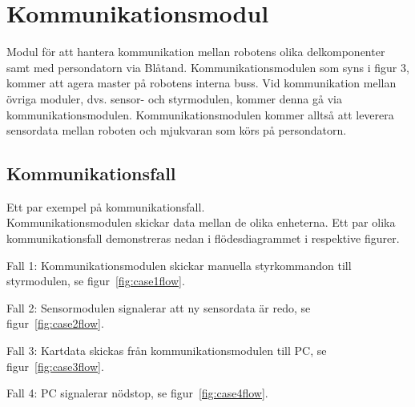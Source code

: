 \documentclass[a4paper,12pt,fleqn]{article}
\begin{document}
\addto\captionsswedish{\renewcommand{\contentsname}{Innehållsförteckning}}

\tableofcontents
\thispagestyle{fancy}
\newpage







\section{Kommunikationsmodul}
Modul för att hantera kommunikation mellan robotens olika delkomponenter samt med persondatorn via Blåtand. Kommunikationsmodulen som syns i figur 3, kommer att agera master på robotens interna buss. Vid kommunikation mellan övriga moduler, dvs. sensor- och styrmodulen, kommer denna gå via kommunikationsmodulen.
Kommunikationsmodulen kommer alltså att leverera sensordata mellan roboten och mjukvaran som körs på persondatorn.

\subsection{Kommunikationsfall}
Ett par exempel på kommunikationsfall. \\

Kommunikationsmodulen skickar data mellan de olika enheterna. Ett par olika kommunikationsfall demonstreras nedan i flödesdiagrammet i respektive figurer.

Fall 1: Kommunikationsmodulen skickar manuella styrkommandon till styrmodulen, se figur~\ref{fig:case1flow}.

Fall 2: Sensormodulen signalerar att ny sensordata är redo, se  figur~\ref{fig:case2flow}.

Fall 3: Kartdata skickas från kommunikationsmodulen till PC, se figur~\ref{fig:case3flow}. 

Fall 4: PC signalerar nödstop, se figur~\ref{fig:case4flow}. 
\end{document}
